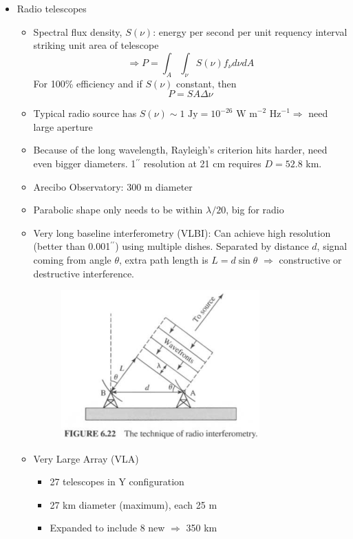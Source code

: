 \documentclass[12pt]{article}
\begin{document}
\begin{itemize}
\item Radio telescopes
\begin{itemize}
\item Spectral flux density, $S(\nu)$: energy per second per unit requency interval striking unit area of telescope
\begin{equation}
\Longrightarrow P = \int_A\int_\nu S(\nu) f_\nu d\nu dA
\end{equation}
For 100\% efficiency and if $S(\nu)$ constant, then \begin{equation}
P = S A \Delta\nu
\end{equation}
\item Typical radio source has $S(\nu)\sim 1\text{ Jy} = 10^{-26}\text{ W m}^{-2}\text{ Hz}^{-1} \Longrightarrow$ need large aperture
\item Because of the long wavelength, Rayleigh's criterion hits harder, need even bigger diameters. 1$^{\prime\prime}$ resolution at 21 cm requires $D = 52.8$ km.
\item Arecibo Observatory: 300 m diameter
\item Parabolic shape only needs to be within $\lambda/20$, big for radio
\item Very long baseline interferometry (VLBI): Can achieve high resolution (better than 0.001$^{\prime\prime}$) using multiple dishes. Separated by distance $d$, signal coming from angle $\theta$, extra path length is $L = d\sin\theta$ $\Longrightarrow$ constructive or destructive interference.
\begin{figure}[h!]
\centering
\includegraphics[width = 3in]{CandOfigs/vlbi.png}
\end{figure}
\item Very Large Array (VLA)
\begin{itemize}
\item 27 telescopes in Y configuration
\item 27 km diameter (maximum), each 25 m
\item Expanded to include 8 new $\Longrightarrow$ 350 km

\end{itemize}
\end{itemize}
\end{itemize}
\end{document}
